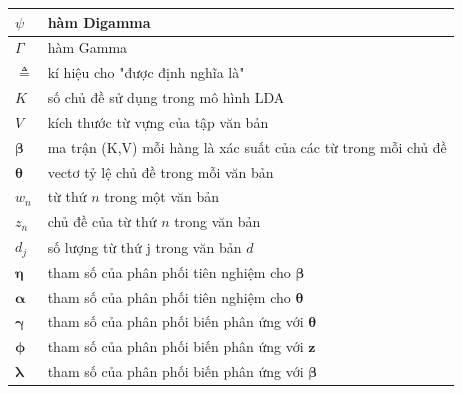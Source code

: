 \documentclass[fontsize=13pt]{scrartcl}
\begin{document}
\begin{table}[H]
\begin{tabular}{|l|l|}
\hline
$\psi$ & hàm Digamma\\ \hline
$\Gamma$ & hàm Gamma \\ \hline
$\triangleq$ & kí hiệu cho "được định nghĩa là" \\ \hline
$K$ & số chủ đề sử dụng trong mô hình LDA \\ \hline
$V$ & kích thước từ vựng của tập văn bản\\ \hline
$\boldsymbol\beta $ & ma trận (K,V) mỗi hàng là xác suất của các từ trong mỗi chủ đề \\ \hline
$\boldsymbol\theta$ &vectơ tỷ lệ chủ đề trong mỗi văn bản \\ \hline
$w_n$ & từ thứ $n$ trong một văn bản \\ \hline
$z_n$ & chủ đề của từ thứ $n$ trong văn bản \\ \hline
$d_j$ & số lượng từ thứ j trong văn bản $d$\\ \hline
$\boldsymbol\eta $ & tham số của phân phối tiên nghiệm cho $\boldsymbol\beta$ \\ \hline 
$\boldsymbol\alpha$ & tham số của phân phối tiên nghiệm cho $\boldsymbol\theta$ \\ \hline
$\boldsymbol\gamma$ & tham số của phân phối biến phân ứng với $\boldsymbol\theta$ \\ \hline
$\boldsymbol\phi$ & tham số của phân phối biến phân ứng với $\mathbf{z}$ \\ \hline
$\boldsymbol\lambda$ & tham số của phân phối biến phân ứng với $\boldsymbol\beta$ \\ \hline
\end{tabular}
\end{table}

\newpage
\listoffigures 

\newpage
\listoftables
\newpage 
\end{document}
